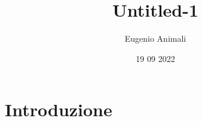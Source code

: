 \documentclass{article}
\title{Untitled-1}
\author{Eugenio Animali}
\date{19 09 2022}
\begin{document}
\maketitle

\section*{Introduzione}
\end{document}
